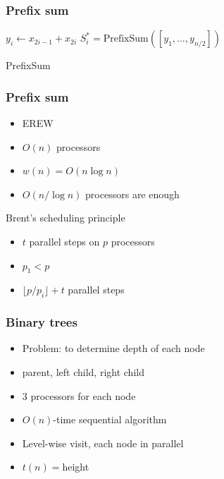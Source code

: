\documentclass[14pt]{beamer}
\begin{document}
\begin{frame}\frametitle{Prefix sum}
\begin{algorithm}[H]

{
  $y_{i}\gets x_{2i-1} + x_{2i}$\;
}
$S^{*}_{i} = \text{PrefixSum}([y_{1}, \ldots , y_{n/2}])$\;
{
}
\caption{PrefixSum}
\end{algorithm}
\end{frame}


\begin{frame}\frametitle{Prefix sum}
  \begin{itemize}
  \item
    EREW
  \item
    $O(n)$ processors
  \item
    $w(n) = O(n\log n)$
  \item
    $O(n/\log n)$ processors are enough
  \end{itemize}

\begin{block}{Brent's scheduling principle}
  \begin{itemize}
  \item
    $t$ parallel steps on $p$ processors
  \item
    $p_{1}<p$
  \item
    $\lfloor p/p_{i}\rfloor +t$ parallel steps
  \end{itemize}
\end{block}
\end{frame}



\begin{frame}\frametitle{Binary trees}
  \begin{itemize}
  \item
    Problem: to determine depth of each node
  \item
    parent, left child, right child
  \item
    $3$ processors for each node
  \item
    $O(n)$-time sequential algorithm
  \item
    Level-wise visit, each node in parallel
  \item
    $t(n)=$height
  \end{itemize}
\end{frame}
\end{document}
